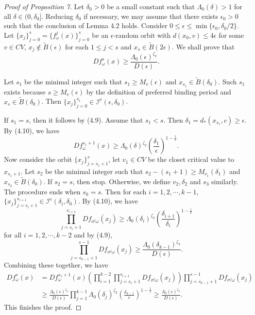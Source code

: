\documentclass[11pt,oneside]{article}
\theoremstyle{plain}
\numberwithin{equation}{section}
\numberwithin{figure}{section}
\numberwithin{table}{section}
\begin{document}
\begin{proof}[Proof of Proposition 7]


Let $\delta_0 >0$ be a small constant such that $\Lambda_0(\delta) > 1$ for all $\delta \in (0, \delta_0]$. Reducing $\delta_0$ if necessary, we may assume that there exists $\epsilon_0 > 0$ such that the conclusion of Lemma 4.2 holds. Consider $0 \leq \epsilon \leq \min\{\epsilon_0, \delta_0/2 \}$. Let $\{x_j \}_{j=0}^s = \{ f_{\omega}^j(x) \}_{j=0}^s $ be an $\epsilon$-random orbit with $d(x_0, v) \leq 4 \epsilon$ for some $v \in CV$, $x_j \notin \tilde B(\epsilon)$ for each $1 \leq j < s$ and $x_s \in \tilde B(2 \epsilon)$. We shall prove that 
\[
Df_{\omega}^s(x) \geq \frac{\Lambda_0(\epsilon)^{\zeta_2}}{D(\epsilon)}.
\]


Let $s_1$ be the minimal integer such that $s_1 \geq M_v(\epsilon)$ and $x_{s_1} \in \tilde B(\delta_0) $. Such $s_1$ exists because $s \geq M_v(\epsilon)$ by the definition of preferred binding period and $x_s \in \tilde B(\delta_0) $. Then $\{x_j \}_{j=0}^{s_1} \in \mathcal I^{\epsilon}(\epsilon, \delta_0)$.


If $s_1 = s$, then it follows by (4.9). Assume that $s_1 < s$. Then $\delta_1 = d_*(x_{s_1}, c) \geq \epsilon$. By (4.10), we have
\begin{equation}
Df_{\omega}^{s_1+1}(x) \geq \Lambda_0(\delta)^{\zeta_2} \left(\frac{\delta_1}{\epsilon} \right)^{1 - \frac{1}{\ell}}.  
\end{equation}
Now consider the orbit $\{ x_j\}_{j=s_1 + 1} ^s$, let $v_1 \in CV$ be the closet critical value to $x_{s_1+1}$. Let $s_2$ be the minimal integer such that $s_2 - (s_1 + 1) \geq M_{v_1}(\delta_1)$ and $x_{s_2} \in \tilde B (\delta_0)$. If $s_2 = s$, then stop. Otherwise, we define $v_2, \delta_2$ and $s_3$ similarly. The procedure ends when $s_k = s$. Then for each $i = 1, 2, \cdots, k-1$, $\{x_j \}_{j=s_i +1}^{s_{i+1}} \in \mathcal I^{\epsilon} (\delta_i, \delta_0)$. By (4.10), we have
\[
\prod_{j=s_i+1}^{s_{i+1}} Df_{\sigma^j \omega}(x_j) \geq \Lambda_0(\delta_i)^{\zeta_2} \left(\frac{\delta_{i+1}}{\delta_i} \right)^{1 - \frac{1}{\ell}}
\]
for all $i = 1, 2, \cdots, k-2$ and by (4.9), 
\[
\prod_{j=s_{k-1}+1}^{s-1} Df_{\sigma^j \omega}(x_j) \geq \frac{\Lambda_0(\delta_{k-1})^{\zeta_2}}{D(\epsilon)}.
\]
Combining these together, we have
\begin{align*}
Df_{\omega}^s (x)& = Df_{\omega}^{s_1+1} (x) \left( \prod_{i=1}^{k-2} \prod_{j = s_i+1}^{s_{i+1}} Df_{\sigma^j \omega}(x_j) \right) \prod_{j=s_{k-1}+1}^{s-1} Df_{\sigma^j \omega}(x_j)\\
& \geq \frac{\Lambda_0(\epsilon)^{\zeta_2}}{D(\epsilon)} \prod_{j=1}^{k-1} \Lambda_0(\delta_j)^{\zeta_2} \left( \frac{\delta_{k-1}}{\epsilon} \right)^{1 - \frac{1}{\ell}} \geq \frac{\Lambda_0(\epsilon)^{\zeta_2}}{D(\epsilon)}.
\end{align*}
This finishes the proof.

\end{proof}
\end{document}
